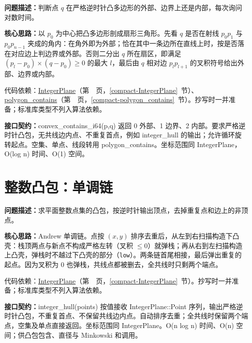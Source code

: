 \noindent\textbf{问题描述：}\allowbreak 判断点 $q$ 在严格逆时针凸多边形的外部、边界上还是内部，每次询问对数时间。

\textbf{核心思路：}\allowbreak 以 $p_0$ 为中心把凸多边形剖成扇形三角形。先看 $q$ 是否在射线 $p_0p_1$ 与 $p_0p_{n-1}$ 夹成的角内：在角外即为外部；恰在其中一条边所在直线上时，按是否落在对应边上判边界或外部。否则二分出 $q$ 所在扇区，即满足 $(p_l-p_0)\times(q-p_0)\ge0$ 的最大 $l$，最后由 $q$ 相对边 $p_lp_{l+1}$ 的叉积符号给出外部、边界或内部。

代码依赖：\hyperref[compact-IntegerPlane]{IntegerPlane}（第~\pageref{compact-IntegerPlane}~页，\ref{compact-IntegerPlane}~节）、\hyperref[compact-polygon_contains]{polygon\_\allowbreak{}contains}（第~\pageref{compact-polygon_contains}~页，\ref{compact-polygon_contains}~节）。抄写时一并准备；标准库类型不列入算法依赖。

{\sloppy{}\noindent\textbf{接口契约：}convex\_contains\_i64(p,q) 返回 0 外部、1 边界、2 内部。要求严格逆时针凸包，无共线边内点、不重复首点，例如 integer\_hull 的输出；允许循环旋转起点。空集、单点、线段转用 polygon\_contains。坐标范围同 IntegerPlane，O(log n) 时间、O(1) 空间。\par}



\Needspace{434pt}

\section{整数凸包：单调链}\label{compact-integer_hull}

\noindent\textbf{问题描述：}\allowbreak 求平面整数点集的凸包，按逆时针输出顶点，去掉重复点和边上的非顶点。

\textbf{核心思路：}\allowbreak Andrew 单调链。点按 $(x,y)$ 排序去重后，从左到右扫描构造下凸壳：栈顶两点与新点不构成严格左转（叉积 $\le0$）就弹栈；再从右到左扫描构造上凸壳，弹栈时不越过下凸壳的部分（\texttt{low}）。两条链首尾相接，最后弹出重复的起点。因为叉积为 0 也弹栈，共线点都被删去，全共线时只剩两个端点。

代码依赖：\hyperref[compact-IntegerPlane]{IntegerPlane}（第~\pageref{compact-IntegerPlane}~页，\ref{compact-IntegerPlane}~节）。抄写时一并准备；标准库类型不列入算法依赖。

{\sloppy{}\noindent\textbf{接口契约：}integer\_hull(points) 按值接收 IntegerPlane::Point 序列，输出严格逆时针凸包，不重复首点、不保留共线边内点。自动排序去重；全共线时保留两个端点，空集及单点直接返回。坐标范围同 IntegerPlane。O(n log n) 时间、O(n) 空间；供凸包包含、直径与 Minkowski 和调用。\par}

